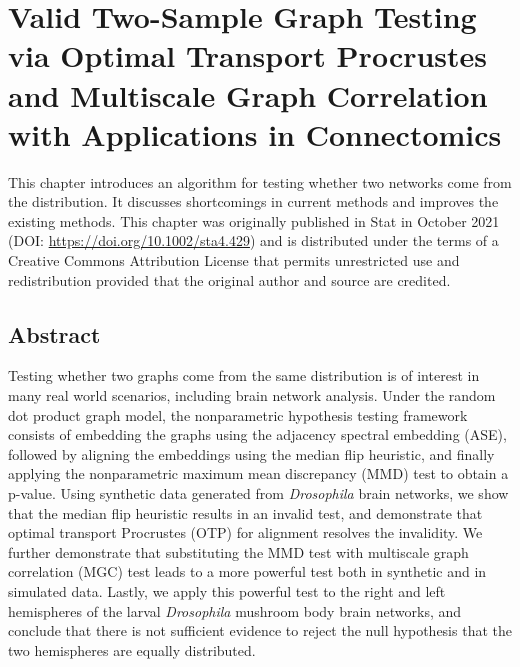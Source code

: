\chapter[Two-Sample Graph Testing]{Valid Two-Sample Graph Testing via Optimal Transport Procrustes and Multiscale Graph Correlation with Applications in Connectomics} \label{chap:nonpar}

This chapter introduces an algorithm for testing whether two networks come from the distribution. It discusses shortcomings in current methods and improves the existing methods. This chapter was originally published in Stat in October 2021 (DOI:  \url{https://doi.org/10.1002/sta4.429}) and is distributed under the terms of a Creative Commons Attribution License that permits unrestricted use and redistribution provided that the original author and source are credited.

\begin{singlespace}         %
     
\end{singlespace} 

\pagebreak
\section*{Abstract}
Testing whether two graphs come from the same distribution is of interest in many real world scenarios, including brain network analysis.
Under the random dot product graph model, the nonparametric hypothesis testing framework consists of embedding the graphs using the adjacency spectral embedding (ASE), followed by  aligning the embeddings using the median flip heuristic, and finally applying the nonparametric maximum mean discrepancy (MMD) test to obtain a p-value.
Using synthetic data generated from \textit{Drosophila} brain networks, we show that the median flip heuristic results in an invalid test, and demonstrate that optimal transport Procrustes (OTP) for alignment resolves the invalidity.
We further demonstrate that substituting the MMD test with multiscale graph correlation (MGC) test leads to a more powerful test both in synthetic and in simulated data.
Lastly, we apply this powerful test to the right and left hemispheres of the larval \textit{Drosophila} mushroom body brain networks, and conclude that there is not sufficient evidence to reject the null hypothesis that the two hemispheres are equally distributed.

\pagebreak


